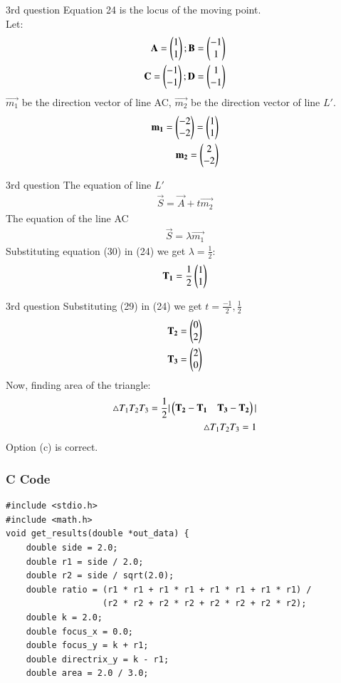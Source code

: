 \documentclass{beamer}
\begin{document}
\begin{frame}{3rd question}
    Equation 24 is the locus of the moving point.\\
Let:
\begin{align}
    \mathbf{A}=\begin{pmatrix}1\\1\end{pmatrix};\mathbf{B}=\begin{pmatrix}-1\\1\end{pmatrix}\\
    \mathbf{C}=\begin{pmatrix}-1\\-1\end{pmatrix};\mathbf{D}=\begin{pmatrix}1\\-1\end{pmatrix}
\end{align}
$\vec{m_1}$ be the direction vector of line AC, $\vec{m_2}$ be the direction vector of line $L'$.
\begin{align}
    \mathbf{m_1} = \begin{pmatrix}-2\\-2\end{pmatrix}=\begin{pmatrix}1\\1\end{pmatrix}\\
    \mathbf{m_2} = \begin{pmatrix}2\\-2\end{pmatrix}
\end{align}
\end{frame}

\begin{frame}{3rd question}
    The equation of line $L'$ 
\begin{align} \vec{S}=\vec{A}+t\vec{m_2}\end{align}
The equation of the line AC
\begin{align}
\vec{S}=\lambda \vec{m_1}
\end{align}
Substituting equation (30) in (24) we get $\lambda=\frac{1}{2}$:
\begin{align}
    \mathbf{T_1}=\frac{1}{2}\begin{pmatrix}1\\1\end{pmatrix}
\end{align}
\end{frame}

\begin{frame}{3rd question}
    Substituting (29) in (24) we get $t=\frac{-1}{2},\frac{1}{2}$
\begin{align}
    \mathbf{T_2}=\begin{pmatrix}0\\2\end{pmatrix}\\
    \mathbf{T_3}=\begin{pmatrix}2\\0\end{pmatrix}
\end{align}
Now, finding area of the triangle:
\begin{align}
    \triangle T_1T_2T_3=\frac{1}{2}|\begin{pmatrix}\mathbf{T_2}-\mathbf{T_1}&\mathbf{T_3}-\mathbf{T_2}\end{pmatrix}|\\
    \triangle T_1T_2T_3 = 1
\end{align}
Option (c) is correct.
\end{frame}
\begin{frame}[fragile]
    \frametitle{C Code}
    \begin{lstlisting}
#include <stdio.h>
#include <math.h>
void get_results(double *out_data) {
    double side = 2.0;
    double r1 = side / 2.0;          
    double r2 = side / sqrt(2.0);   
    double ratio = (r1 * r1 + r1 * r1 + r1 * r1 + r1 * r1) /
                   (r2 * r2 + r2 * r2 + r2 * r2 + r2 * r2);
    double k = 2.0;
    double focus_x = 0.0;
    double focus_y = k + r1;
    double directrix_y = k - r1;
    double area = 2.0 / 3.0;
    \end{lstlisting}
\end{frame}
\end{document}
